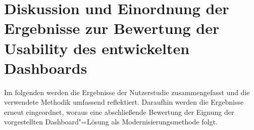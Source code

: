 \chapter{Diskussion und Einordnung der Ergebnisse zur Bewertung der Usability des entwickelten Dashboards}
\label{ch:Diskussion}

Im folgenden werden die Ergebnisse der Nutzerstudie zusammengefasst und die verwendete Methodik umfassend reflektiert. Daraufhin werden die Ergebnisse erneut eingeordnet, woraus eine abschließende Bewertung der Eignung der vorgestellten Dash\-board"=Lösung als Modernisierungsmethode folgt.

%
%
%
%





